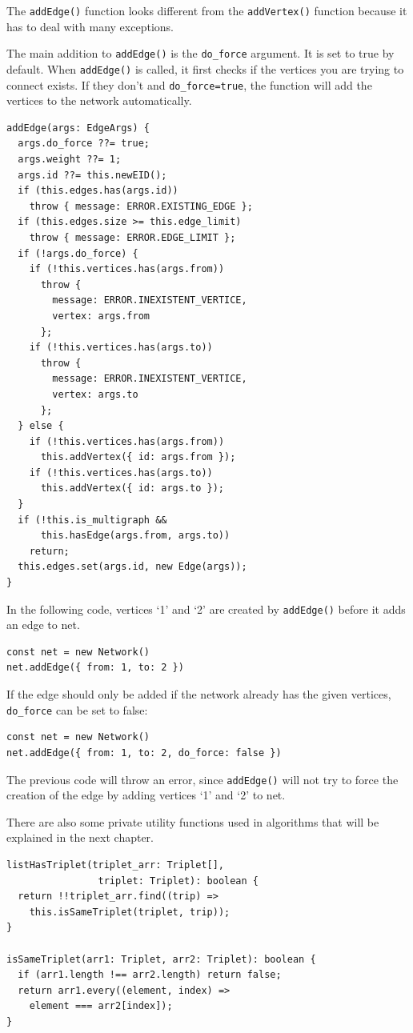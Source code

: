 The \texttt{addEdge()} function looks different from the
\texttt{addVertex()} function because it has to deal with many exceptions.

The main addition to \texttt{addEdge()} is the \texttt{do_force} argument.
It is set to true by default.
When \texttt{addEdge()} is called,
it first checks if the vertices you are trying to connect exists.
If they don't and \texttt{do_force=true},
the function will add the vertices to the network automatically.

\begin{verbatim}
addEdge(args: EdgeArgs) {
  args.do_force ??= true;
  args.weight ??= 1;
  args.id ??= this.newEID();
  if (this.edges.has(args.id))
    throw { message: ERROR.EXISTING_EDGE };
  if (this.edges.size >= this.edge_limit)
    throw { message: ERROR.EDGE_LIMIT };
  if (!args.do_force) {
    if (!this.vertices.has(args.from))
      throw {
        message: ERROR.INEXISTENT_VERTICE,
        vertex: args.from
      };
    if (!this.vertices.has(args.to))
      throw {
        message: ERROR.INEXISTENT_VERTICE,
        vertex: args.to
      };
  } else {
    if (!this.vertices.has(args.from))
      this.addVertex({ id: args.from });
    if (!this.vertices.has(args.to))
      this.addVertex({ id: args.to });
  }
  if (!this.is_multigraph &&
      this.hasEdge(args.from, args.to))
    return;
  this.edges.set(args.id, new Edge(args));
}
\end{verbatim}

In the following code, vertices `1' and `2' are created by \texttt{addEdge()}
before it adds an edge to net.

\begin{verbatim}
const net = new Network()
net.addEdge({ from: 1, to: 2 })
\end{verbatim}

If the edge should only be added if the network already has the given vertices,
\texttt{do_force} can be set to false:

\begin{verbatim}
const net = new Network()
net.addEdge({ from: 1, to: 2, do_force: false })
\end{verbatim}

The previous code will throw an error, since \texttt{addEdge()}
will not try to force the creation of the edge by
adding vertices `1' and `2' to net.

There are also some private utility functions used in algorithms
that will be explained in the next chapter.

\begin{verbatim}
listHasTriplet(triplet_arr: Triplet[],
                triplet: Triplet): boolean {
  return !!triplet_arr.find((trip) =>
    this.isSameTriplet(triplet, trip));
}

isSameTriplet(arr1: Triplet, arr2: Triplet): boolean {
  if (arr1.length !== arr2.length) return false;
  return arr1.every((element, index) =>
    element === arr2[index]);
}
\end{verbatim}
